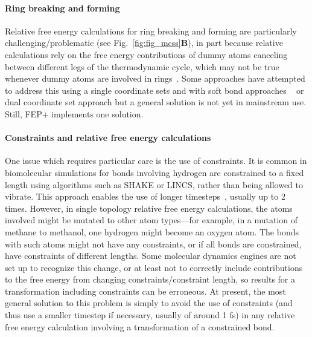 \documentclass[9pt,bestpractices]{livecoms}
\begin{document}


\paragraph{Ring breaking and forming} \label{subsec: Ring breaking and forming}
Relative free energy calculations for ring breaking and forming are particularly challenging/problematic (see Fig.~\ref{fig:fig_mcss}\textbf{B}), in part because relative calculations rely on the free energy contributions of dummy atoms canceling between different legs of the thermodynamic cycle, which may not be true whenever dummy atoms are involved in rings~\cite{liu2015ring}.
Some approaches have attempted to address this using a single coordinate sets and with soft bond approaches ~\cite{clark2019relative,wang2017accurate} or dual coordinate set approach \cite{jespers2019qligfep, ries2022relative, bhati2017, bieniek2021} but a general solution is not yet in mainstream use. Still, FEP+ implements one solution\cite{wang2017accurate}.

\paragraph{Constraints and relative free energy calculations}
One issue which requires particular care is the use of constraints.
It is common in biomolecular simulations for bonds involving hydrogen are constrained to a fixed length using algorithms such as SHAKE or LINCS, rather than being allowed to vibrate.  This approach enables the use of longer timesteps~\cite{krautler2001fast}, usually up to 2 times. 
However, in single topology relative free energy calculations, the atoms involved might be mutated to other atom types---for example, in a mutation of methane to methanol, one hydrogen might become an oxygen atom. The bonds with such atoms might not have any constraints, or if all bonds are constrained, have constraints of different lengths. 
Some molecular dynamics engines are not set up to recognize this change, or at least not to correctly include contributions to the free energy from changing constraints/constraint length, so results for a transformation including constraints can be erroneous.
At present, the most general solution to this problem is simply to avoid the use of constraints (and thus use a smaller timestep if necessary, usually of around 1 fs) in any relative free energy calculation involving a transformation of a constrained bond. 
\end{document}
